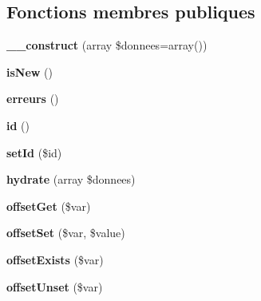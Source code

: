 \subsection*{Fonctions membres publiques}
\begin{DoxyCompactItemize}
\item 
\hypertarget{class_library_1_1_entity_a173f6b92788acf7c40d690292aaded2c}{{\bfseries \+\_\+\+\_\+construct} (array \$donnees=array())}\label{class_library_1_1_entity_a173f6b92788acf7c40d690292aaded2c}

\item 
\hypertarget{class_library_1_1_entity_ad5305cbf1b1f253e8bef4b2c478dacb0}{{\bfseries is\+New} ()}\label{class_library_1_1_entity_ad5305cbf1b1f253e8bef4b2c478dacb0}

\item 
\hypertarget{class_library_1_1_entity_afa6e81c26f240d44bb65d8483b49be53}{{\bfseries erreurs} ()}\label{class_library_1_1_entity_afa6e81c26f240d44bb65d8483b49be53}

\item 
\hypertarget{class_library_1_1_entity_a087060b582403885d08e89ad894ecc5d}{{\bfseries id} ()}\label{class_library_1_1_entity_a087060b582403885d08e89ad894ecc5d}

\item 
\hypertarget{class_library_1_1_entity_a87313ad678fb2a2a8efb435cf0bdb9a0}{{\bfseries set\+Id} (\$id)}\label{class_library_1_1_entity_a87313ad678fb2a2a8efb435cf0bdb9a0}

\item 
\hypertarget{class_library_1_1_entity_a87c5a7da7b956f93a01db1a727d9932c}{{\bfseries hydrate} (array \$donnees)}\label{class_library_1_1_entity_a87c5a7da7b956f93a01db1a727d9932c}

\item 
\hypertarget{class_library_1_1_entity_ab6ed81b7e08e386c78617b3016ea9f9e}{{\bfseries offset\+Get} (\$var)}\label{class_library_1_1_entity_ab6ed81b7e08e386c78617b3016ea9f9e}

\item 
\hypertarget{class_library_1_1_entity_a15803baee4ed99655318d091412c6b03}{{\bfseries offset\+Set} (\$var, \$value)}\label{class_library_1_1_entity_a15803baee4ed99655318d091412c6b03}

\item 
\hypertarget{class_library_1_1_entity_aea19d3ef2fbe7a108f393a1b39f1dd34}{{\bfseries offset\+Exists} (\$var)}\label{class_library_1_1_entity_aea19d3ef2fbe7a108f393a1b39f1dd34}

\item 
\hypertarget{class_library_1_1_entity_aafb755862dcdc36cab4c4322b25e781a}{{\bfseries offset\+Unset} (\$var)}\label{class_library_1_1_entity_aafb755862dcdc36cab4c4322b25e781a}

\end{DoxyCompactItemize}
